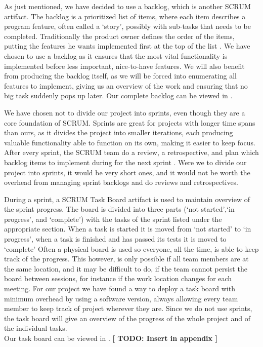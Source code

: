 As just mentioned, we have decided to use a backlog, which is another SCRUM artifact.
The backlog is a prioritized list of items, where each item describes a program feature, often called a `story', possibly with sub-tasks that needs to be completed. Traditionally the product owner defines the order of the items, putting the features he wants implemented first at the top of the list \cite[p. 12]{scrum-org-guide}.
We have chosen to use a backlog as it ensures that the most vital functionality is implemented before less important, nice-to-have features. We will also benefit from producing the backlog itself, as we will be forced into enumerating all features to implement, giving us an overview of the work and ensuring that no big task suddenly pops up later.
Our complete backlog can be viewed in .

We have chosen not to divide our project into sprints, even though they are a core foundation of SCRUM.
Sprints are great for projects with longer time spans than ours, as it divides the project into smaller iterations, each producing valuable functionality able to function on its own, making it easier to keep focus.
After every sprint, the SCRUM team do a review, a retrospective, and plan which backlog items to implement during for the next sprint \cite[p. 8]{scrum-org-guide}.
Were we to divide our project into sprints, it would be very short ones, and it would not be worth the overhead from managing sprint backlogs and do reviews and retrospectives.

During a sprint, a SCRUM Task Board artifact is used to maintain overview of the sprint progress. The board is divided into three parts (`not started',`in progress', and `complete') with the tasks of the sprint listed under the appropriate section.
When a task is started it is moved from `not started' to `in progress', when a task is finished and has passed its tests it is moved to `complete'
Often a physical board is used so everyone, all the time, is able to keep track of the progress. This however, is only possible if all team members are at the same location, and it may be difficult to do, if the team cannot persist the board between sessions, for instance if the work location changes for each meeting.
For our project we have found a way to deploy a task board with minimum overhead by using a software version, always allowing every team member to keep track of project wherever they are. Since we do not use sprints, the task board will give an overview of the progress of the whole project and of the individual tasks.\\
Our task board can be viewed in . \textbf{[ TODO: Insert in appendix ]}

